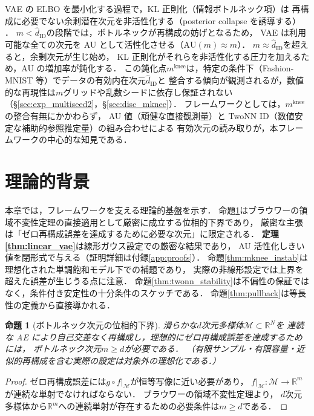 \documentclass[11pt,a4paper]{jsarticle}
\newtheorem{proposition}{命題}
\newcommand{\R}{\mathbb{R}}
\newcommand{\mknee}{m^{\mathrm{knee}}}
\begin{document}
VAE の ELBO を最小化する過程で，KL 正則化（情報ボトルネック項）は
再構成に必要でない余剰潜在次元を非活性化する（posterior collapse を誘導する）
\cite{lucas2019elbo,higgins2017betavae}．
$m < \hat{d}_\mathrm{ID}$の段階では，ボトルネックが再構成の妨げとなるため，
VAE は利用可能な全ての次元を AU として活性化させる（$\mathrm{AU}(m) \approx m$）．
$m \approx \hat{d}_\mathrm{ID}$を超えると，余剰次元が生じ始め，
KL 正則化がそれらを非活性化する圧力を加えるため，AU の増加率が鈍化する．
この鈍化点$\mknee$は，特定の条件下（Fashion-MNIST 等）でデータの有効内在次元$\hat{d}_\mathrm{ID}$と
整合する傾向が観測されるが，数値的な再現性は$m$グリッドや乱数シードに依存し保証されない
（§\ref{sec:exp_multiseed2}，§\ref{sec:disc_mknee}）．
フレームワークとしては，$\mknee$の整合有無にかかわらず，
AU 値（頑健な直接観測量）と TwoNN ID（数値安定な補助的参照推定量）の組み合わせによる
有効次元の読み取りが，本フレームワークの中心的な知見である．

\section{理論的背景}\label{sec:theory}

本章では，フレームワークを支える理論的基盤を示す．
命題\ref{thm:lower_bound}はブラウワーの領域不変性定理の直接適用として厳密に成立する位相的下界であり，
厳密な主張は「ゼロ再構成誤差を達成するために必要な次元」に限定される．
\textbf{定理\ref{thm:linear_vae}}は線形ガウス設定での厳密な結果であり，
AU 活性化しきい値を閉形式で与える（証明詳細は付録\ref{app:proofs}）．
命題\ref{thm:mknee_instab}は理想化された単調飽和モデル下での補題であり，
実際の非線形設定では上界を超えた誤差が生じうる点に注意．
命題\ref{thm:twonn_stability}は不偏性の保証ではなく，条件付き安定性の十分条件のスケッチである．
命題\ref{thm:pullback}は等長性の定義から直接導かれる．

\begin{proposition}[ボトルネック次元の位相的下界]\label{thm:lower_bound}
滑らかな$d$次元多様体$\mathcal{M} \subset \R^N$を
連続な AE により自己交差なく再構成し，理想的にゼロ再構成誤差を達成するためには，
ボトルネック次元$m \geq d$が必要である．
（有限サンプル・有限容量・近似的再構成を含む実際の設定は対象外の理想化である．）
\end{proposition}

\begin{proof}
ゼロ再構成誤差には$g \circ f|_\mathcal{M}$が恒等写像に近い必要があり，
$f|_\mathcal{M}: \mathcal{M} \to \R^m$が連続な単射でなければならない．
ブラウワーの領域不変性定理\cite{hatcher2002algebraic}より，
$d$次元多様体から$\R^m$への連続単射が存在するための必要条件は$m \geq d$である．
\end{proof}
\end{document}
